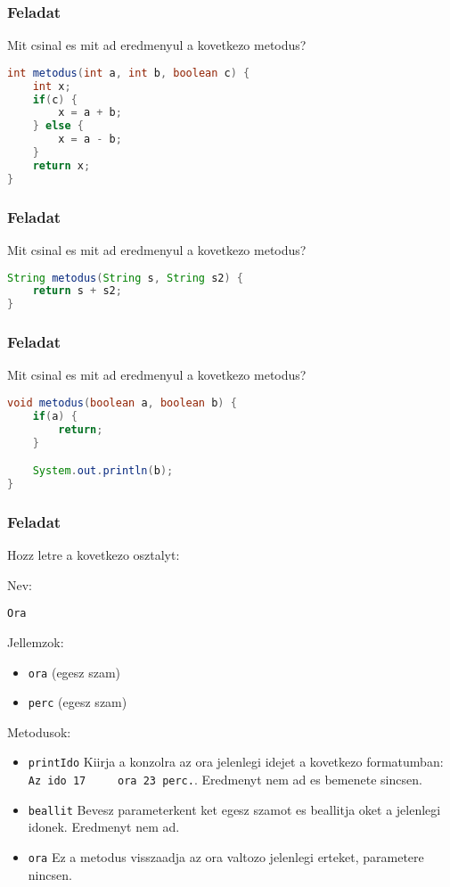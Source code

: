 \documentclass{article}
\let\l\lstinline
\begin{document}
\subsubsection{Feladat}

Mit csinal es mit ad eredmenyul a kovetkezo metodus?

\begin{lstlisting}[language=Java, caption=Feladat]
int metodus(int a, int b, boolean c) {
    int x;
    if(c) {
        x = a + b;
    } else {
        x = a - b;
    }
    return x;
}
\end{lstlisting}

\subsubsection{Feladat}

Mit csinal es mit ad eredmenyul a kovetkezo metodus?

\begin{lstlisting}[language=Java, caption=Feladat]
String metodus(String s, String s2) {
    return s + s2;
}
\end{lstlisting}

\subsubsection{Feladat}

Mit csinal es mit ad eredmenyul a kovetkezo metodus?

\begin{lstlisting}[language=Java, caption=Feladat]
void metodus(boolean a, boolean b) {
    if(a) {
        return;
    }

    System.out.println(b);
}
\end{lstlisting}


\subsubsection{Feladat}

Hozz letre a kovetkezo osztalyt:

Nev:

\l{Ora}

Jellemzok:
\begin{itemize}
    \item \l{ora} (egesz szam)
    \item \l{perc} (egesz szam)
\end{itemize}

Metodusok:
\begin{itemize}
    \item \l{printIdo} Kiirja a konzolra az ora jelenlegi idejet a kovetkezo formatumban: \l{Az ido 17
    ora 23 perc.}. Eredmenyt nem ad es bemenete sincsen.
    \item \l{beallit} Bevesz parameterkent ket egesz szamot es beallitja oket a jelenlegi idonek. Eredmenyt
    nem ad.
    \item \l{ora} Ez a metodus visszaadja az ora valtozo jelenlegi erteket, parametere nincsen.
\end{itemize}
\end{document}
